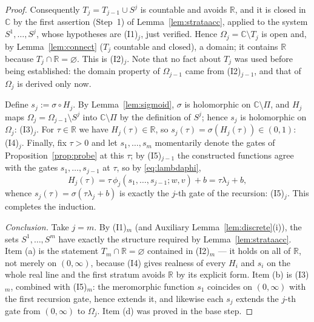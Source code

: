 \documentclass[11pt]{article}
\theoremstyle{definition}
\theoremstyle{remark}
\theoremstyle{plain}
\newcommand{\R}{\mathbb{R}}
\newcommand{\C}{\mathbb{C}}
\newcommand{\sig}{\sigma}
\begin{document}
\begin{proof}
Consequently $T_j=T_{j-1}\cup S^j$ is countable and avoids $\R$, and it is closed in $\C$
by the first assertion (Step~1) of Lemma~\ref{lem:strataacc}, applied to the system
$S^1,\dots,S^j$, whose hypotheses are (I1)$_j$, just verified.  Hence
$\Omega_j=\C\setminus T_j$ is open and, by Lemma~\ref{lem:connect} ($T_j$ countable and
closed), a domain; it contains $\R$ because $T_j\cap\R=\varnothing$.  This is (I2)$_j$.
Note that no fact about $T_j$ was used before being established: the domain property of
$\Omega_{j-1}$ came from (I2)$_{j-1}$, and that of $\Omega_j$ is derived only now.

Define $s_j:=\sig\circ H_j$.  By Lemma~\ref{lem:sigmoid}, $\sig$ is holomorphic on
$\C\setminus\Pi$, and $H_j$ maps $\Omega_j=\Omega_{j-1}\setminus S^j$ into
$\C\setminus\Pi$ by the definition of $S^j$; hence $s_j$ is holomorphic on $\Omega_j$:
(I3)$_j$.  For $\tau\in\R$ we have $H_j(\tau)\in\R$, so
$s_j(\tau)=\sig(H_j(\tau))\in(0,1)$: (I4)$_j$.  Finally, fix $\tau>0$ and let
$s_1,\dots,s_m$ momentarily denote the gates of Proposition~\ref{prop:probe} at this
$\tau$; by (I5)$_{j-1}$ the constructed functions agree with the gates
$s_1,\dots,s_{j-1}$ at $\tau$, so by \eqref{eq:lambdaphi},
\[
H_j(\tau)=\tau\,\phi_j(s_1,\dots,s_{j-1};w,v)+b=\tau\lambda_j+b,
\]
whence $s_j(\tau)=\sig(\tau\lambda_j+b)$ is exactly the $j$-th gate of the recursion:
(I5)$_j$.  This completes the induction.

\emph{Conclusion.}  Take $j=m$.  By (I1)$_m$ (and Auxiliary
Lemma~\ref{lem:discrete}(i)), the sets $S^1,\dots,S^m$ have exactly the structure
required by Lemma~\ref{lem:strataacc}.  Item (a) is the statement
$T_m\cap\R=\varnothing$ contained in (I2)$_m$ --- it holds on all of $\R$, not merely on
$(0,\infty)$, because (I4) gives realness of every $H_i$ and $s_i$ on the whole real line
and the first stratum avoids $\R$ by its explicit form.  Item (b) is (I3)$_m$, combined
with (I5)$_m$: the meromorphic function $s_1$ coincides on $(0,\infty)$ with the first
recursion gate, hence extends it, and likewise each $s_j$ extends the $j$-th gate from
$(0,\infty)$ to $\Omega_j$.  Item (d) was proved in the base step.


\end{proof}
\end{document}
